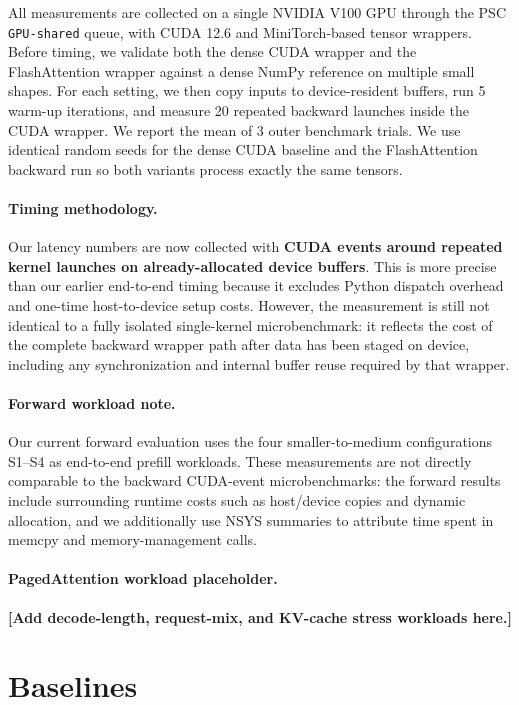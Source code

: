 \documentclass{article}
\begin{document}
All measurements are collected on a single NVIDIA V100 GPU through the PSC \texttt{GPU-shared} queue, with CUDA 12.6 and MiniTorch-based tensor wrappers. Before timing, we validate both the dense CUDA wrapper and the FlashAttention wrapper against a dense NumPy reference on multiple small shapes. For each setting, we then copy inputs to device-resident buffers, run 5 warm-up iterations, and measure 20 repeated backward launches inside the CUDA wrapper. We report the mean of 3 outer benchmark trials. We use identical random seeds for the dense CUDA baseline and the FlashAttention backward run so both variants process exactly the same tensors.

\paragraph{Timing methodology.} Our latency numbers are now collected with \textbf{CUDA events around repeated kernel launches on already-allocated device buffers}. This is more precise than our earlier end-to-end timing because it excludes Python dispatch overhead and one-time host-to-device setup costs. However, the measurement is still not identical to a fully isolated single-kernel microbenchmark: it reflects the cost of the complete backward wrapper path after data has been staged on device, including any synchronization and internal buffer reuse required by that wrapper.


\paragraph{Forward workload note.} Our current forward evaluation uses the four smaller-to-medium configurations S1--S4 as end-to-end prefill workloads. These measurements are not directly comparable to the backward CUDA-event microbenchmarks: the forward results include surrounding runtime costs such as host/device copies and dynamic allocation, and we additionally use NSYS summaries to attribute time spent in memcpy and memory-management calls.

\paragraph{PagedAttention workload placeholder.} \textbf{[Add decode-length, request-mix, and KV-cache stress workloads here.]}

\section{Baselines}
\end{document}
